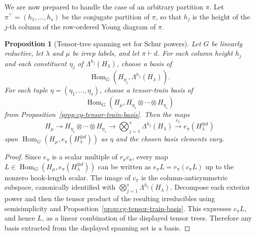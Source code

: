 \documentclass[11pt]{article}
\newcommand{\HomG}[2]{\operatorname{Hom}_G\!\left(#1,#2\right)}
\newtheorem{proposition}[theorem]{Proposition}
\theoremstyle{definition}
\begin{document}
We are now prepared to handle the case of an arbitrary partition $\pi$. Let $\pi^\top=(h_1,\dots,h_s)$ be the conjugate partition of $\pi$, so that $h_j$ is the height of the $j$-th column of the row-ordered Young diagram of $\pi$.

\begin{proposition}[Tensor-tree spanning set for Schur powers]\label{prop:general-schur-tree-spanning}
  Let $G$ be linearly reductive, let $\lambda$ and $\mu$ be irrep labels, and let $\pi\vdash d$.  For each column height $h_j$ and each constituent $\eta_j$ of $\Lambda^{h_j}(H_\lambda)$, choose a basis of
  \[
    \HomG{H_{\eta_j}}{\Lambda^{h_j}(H_\lambda)}.
  \]
  For each tuple $\eta=(\eta_1,\dots,\eta_s)$, choose a tensor-train basis of
  \[
    \HomG{H_\mu}{H_{\eta_1}\otimes\cdots\otimes H_{\eta_s}}
  \]
  from Proposition~\ref{prop:cg-tensor-train-basis}.  Then the maps
  \[
    H_\mu
    \longrightarrow
    H_{\eta_1}\otimes\cdots\otimes H_{\eta_s}
    \longrightarrow
    \bigotimes_{j=1}^s \Lambda^{h_j}(H_\lambda)
    \xrightarrow{\ r_\pi\ }
    e_\pi(H_\lambda^{\otimes d})
  \]
  span $\HomG{H_\mu}{e_\pi(H_\lambda^{\otimes d})}$ as $\eta$ and the chosen basis elements vary.
\end{proposition}
\begin{proof}
  Since $e_\pi$ is a scalar multiple of $r_\pi c_\pi$, every map $L\in\HomG{H_\mu}{e_\pi(H_\lambda^{\otimes d})}$ can be written as $e_\pi L=r_\pi(c_\pi L)$ up to the nonzero hook-length scalar.  The image of $c_\pi$ is the column-antisymmetric subspace, canonically identified with $\bigotimes_{j=1}^s\Lambda^{h_j}(H_\lambda)$.  Decompose each exterior power and then the tensor product of the resulting irreducibles using semisimplicity and Proposition~\ref{prop:cg-tensor-train-basis}.  This expresses $c_\pi L$, and hence $L$, as a linear combination of the displayed tensor trees.  Therefore any basis extracted from the displayed spanning set is a basis.
\end{proof}
\end{document}
